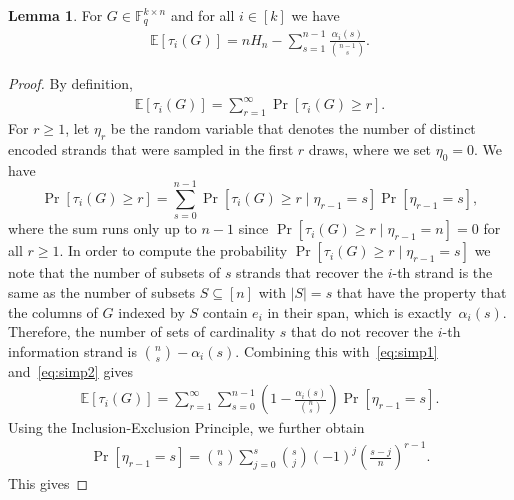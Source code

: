 \documentclass[11pt,a4paper,reqno,twoside]{amsart}
\theoremstyle{definition}
\newtheorem{lemma}{Lemma}
\newcommand{\F}{\mathbb{F}}
\newcommand{\E}{\mathbb{E}}
\newcommand{\mE}{\mathcal{E}}
\begin{document}
\begin{lemma} \label{lem:fi}
For $G\in \F_q^{k \times n}$ and for all $i\in[k]$ we have
\begin{align*}
    \E[\tau_i(G)] =  n H_n - \sum_{s=1}^{n-1} \displaystyle \frac{\alpha_i(s)}{\binom{n-1}{s}}.
\end{align*}
\end{lemma}
\begin{proof}
By definition,
\begin{align} \label{eq:simp1}
    \E[\tau_i(G)] = \sum_{r=1}^\infty \Pr[\tau_i(G) \ge r].
\end{align}
For $r \ge 1$, let $\eta_{r}$ be the random variable that denotes the number of distinct encoded strands that were sampled in the first $r$ draws, where we set $\eta_0=0$. We have
\begin{equation} \label{eq:simp2}
\Pr[\tau_i(G) \ge r] = 
\sum_{s=0}^{n-1}\Pr[\tau_i(G) \ge r \mid \eta_{r-1} = s] \Pr[\eta_{r-1} = s],
\end{equation}
where the sum runs only up to $n-1$ since $\Pr[\tau_i(G) \ge r \mid \eta_{r-1} = n] = 0$ for all $r \ge 1$.
In order to compute the probability $\Pr[\tau_i(G) \ge r \mid \eta_{r-1} = s]$ we note that the number of subsets of $s$ strands that recover the $i$-th strand is the same as the number of subsets $S\subseteq [n]$ with $|S| = s$ that have the property that the columns of $G$ indexed by $S$ contain $e_i$ in their span, which is exactly~$\alpha_i(s)$.
Therefore, the number of sets of cardinality $s$ that do not recover the $i$-th information strand is $\binom{n}{s}-\alpha_i(s)$.
Combining this with~\eqref{eq:simp1} and~\eqref{eq:simp2} gives
\begin{align*}
    \E[\tau_i(G)] = \sum_{r=1}^\infty \sum_{s=0}^{n-1}\left(1-\frac{\alpha_i(s)}{\binom{n}{s}}\right)  \Pr[\eta_{r-1} = s].
\end{align*}
Using the Inclusion-Exclusion Principle, we further obtain
\begin{align*}
    \Pr[\eta_{r-1} = s] =\binom{n}{s}\displaystyle\sum_{j=0}^{s}\binom{s}{j}(-1)^j\left(\frac{s-j}{n}\right)^{r-1}.
\end{align*}
This gives 
\allowdisplaybreaks

\end{proof}
\end{document}
